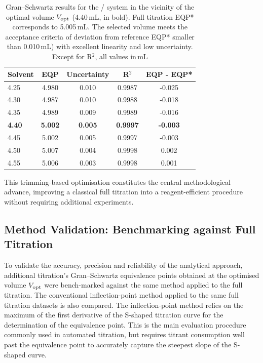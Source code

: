 \documentclass[twoside,twocolumn,9pt]{article}
\begin{document}
\begin{table}[h]
\small
  \caption{Gran--Schwartz results for the / system in the vicinity of the optimal volume $V_{\rm opt}$ (4.40\,mL, in bold).
  Full titration EQP* corresponds to 5.005\,mL.
  The selected volume meets the acceptance criteria of deviation from reference EQP* smaller than 0.010\,mL) with excellent linearity and low uncertainty.
  Except for R$^2$, all values in\,mL}
  \label{tab:trimming}
  \begin{tabular*}{0.48\textwidth}{@{\extracolsep{\fill}}lcccc}
    \hline
    Solvent & EQP & Uncertainty & R$^2$ & EQP - EQP* \\
    \hline
    4.25 & 4.980 & 0.010 & 0.9987 & -0.025 \\
    4.30 & 4.987 & 0.010 & 0.9988 & -0.018 \\
    4.35 & 4.989 & 0.009 & 0.9989 & -0.016 \\
    \textbf{4.40} & \textbf{5.002} & \textbf{0.005} & \textbf{0.9997} & \textbf{-0.003} \\
    4.45 & 5.002 & 0.005 & 0.9997 & -0.003 \\
    4.50 & 5.007 & 0.004 & 0.9998 & \phantom{-}0.002 \\
    4.55 & 5.006 & 0.003 & 0.9998 & \phantom{-}0.001 \\
    \hline
  \end{tabular*}
\end{table}

This trimming-based optimisation constitutes the central methodological advance, improving a classical full titration into a reagent-efficient procedure without requiring additional experiments.

\subsection*{Method Validation: Benchmarking against Full Titration}

To validate the accuracy, precision and reliability of the analytical approach, additional titration's Gran--Schwartz equivalence points obtained at the optimised volume \(V_{\rm opt}\) were bench-marked against the same method applied to the full titration.
The conventional inflection-point method applied to the same full titration datasets is also compared.
The inflection-point method relies on the maximum of the first derivative of the S-shaped titration curve for the determination of the equivalence point. This is the main evaluation procedure commonly used in automated titration, but requires titrant consumption well past the equivalence point to accurately capture the steepest slope of the S-shaped curve.
\end{document}
